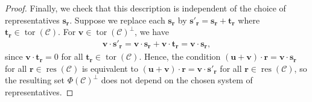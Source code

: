 \documentclass[10pt,a4paper]{amsart}
\begin{document}
\begin{proof}
Finally, we check that this description is independent of the choice of
representatives $\mathbf{s}_{\mathbf{r}}$. Suppose we replace each
$\mathbf{s}_{\mathbf{r}}$ by
$
\mathbf{s}'_{\mathbf{r}} = \mathbf{s}_{\mathbf{r}} + \mathbf{t}_{\mathbf{r}}
$
where $\mathbf{t}_{\mathbf{r}} \in \operatorname{tor}(\mathcal{C})$.
For $\mathbf{v} \in \operatorname{tor}(\mathcal{C})^\perp$, we have
\begin{align*}
\mathbf{v} \cdot \mathbf{s}'_{\mathbf{r}}
=
\mathbf{v} \cdot \mathbf{s}_{\mathbf{r}}
+
\mathbf{v} \cdot \mathbf{t}_{\mathbf{r}}
=
\mathbf{v} \cdot \mathbf{s}_{\mathbf{r}},
\end{align*}
since $\mathbf{v} \cdot \mathbf{t}_{\mathbf{r}} = 0$ for all
$\mathbf{t}_{\mathbf{r}} \in \operatorname{tor}(\mathcal{C})$. Hence, the condition
$
(\mathbf{u} + \mathbf{v}) \cdot \mathbf{r}
=
\mathbf{v} \cdot \mathbf{s}_{\mathbf{r}}
$
for all $\mathbf{r} \in \operatorname{res}(\mathcal{C})$
is equivalent to
$
(\mathbf{u} + \mathbf{v}) \cdot \mathbf{r}
=
\mathbf{v} \cdot \mathbf{s}'_{\mathbf{r}}
$
for all $\mathbf{r} \in \operatorname{res}(\mathcal{C})
$,
so the resulting set $\Phi(\mathcal{C})^\perp$ does not depend on the chosen
system of representatives.
\end{proof}
\end{document}

